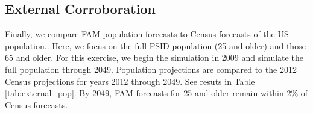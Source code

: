 \subsection{External Corroboration}
Finally, we compare FAM population forecasts to Census forecasts of the US population..  Here, we focus on the full PSID population (25 and older) and those 65 and 
older.  For this exercise, we begin the simulation in 2009 and simulate the full population through 2049.  Population projections are compared to the 2012 Census 
projections for years 2012 through 2049.  See resuts in Table \ref{tab:external_pop}.  By 2049, FAM forecasts for 25 and older remain within 2\% of Census forecasts.